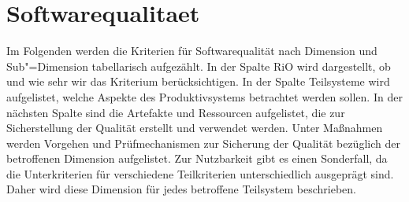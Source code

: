 \section{Softwarequalitaet}
Im Folgenden werden die Kriterien für Softwarequalität nach Dimension und Sub"=Dimension tabellarisch aufgezählt. In der Spalte RiO wird dargestellt, ob und wie sehr wir das Kriterium berücksichtigen. In der Spalte Teilsysteme wird aufgelistet, welche Aspekte des Produktivsystems betrachtet werden sollen. In der nächsten Spalte sind die Artefakte und Ressourcen aufgelistet, die zur Sicherstellung der Qualität erstellt und verwendet werden. Unter Maßnahmen werden Vorgehen und Prüfmechanismen zur Sicherung der Qualität bezüglich der betroffenen Dimension aufgelistet.
Zur Nutzbarkeit gibt es einen Sonderfall, da die Unterkriterien für verschiedene Teilkriterien unterschiedlich ausgeprägt sind. Daher wird diese Dimension für jedes betroffene Teilsystem beschrieben.

